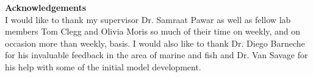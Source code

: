 
\mbox{}\newline\vspace{10mm} \mbox{}\LARGE
%
{\bf Acknowledgements} \normalsize \vspace{5mm}\\
I would like to thank my supervisor Dr. Samraat Pawar as well as fellow lab members Tom Clegg and Olivia Moris so much of their time on weekly, and on occasion more than weekly, basis.  I would also like to thank Dr. Diego Barneche for his invaluable feedback in the area of marine and fish and Dr. Van Savage for his help with some of the initial model development.





